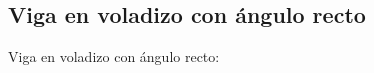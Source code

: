 \documentclass[
  aspectratio=169,
]{beamer}
\begin{document}
\begin{small}
\subsection[Viga en voladizo con ángulo recto]{Viga en voladizo con ángulo recto}
\begin{frame}[t]{Viga en voladizo con ángulo recto:}
	\begin{columns}[T,onlytextwidth]
		\begin{column}{.58\textwidth}
			\begin{minipage}{\textwidth}
				\begin{figure}[htbp]
				\label{fig:RN:RA:Ilusxy}
				\label{fig:RN:RA:Ilusyz}
				\end{figure}
					\begin{figure}[htbp]
					

\end{figure}
\end{minipage}
\end{column}
\end{columns}
\end{frame}
\end{small}
\end{document}

